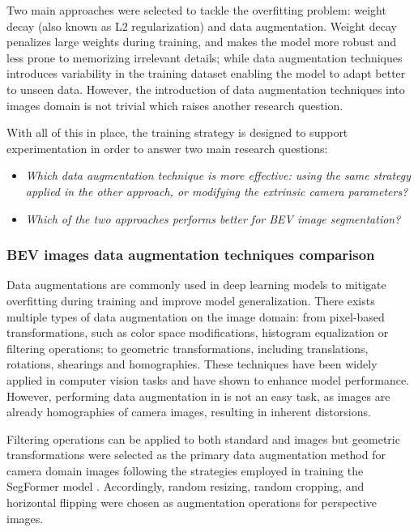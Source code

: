 Two main approaches were selected to tackle the overfitting problem: weight decay (also known as L2 regularization) and data augmentation. Weight decay penalizes large weights during training, and makes the model more robust and less prone to memorizing irrelevant details; while data augmentation techniques introduces variability in the training dataset enabling the model to adapt better to unseen data. However, the introduction of data augmentation techniques into  images domain is not trivial which raises another research question.

With all of this in place, the training strategy is designed to support experimentation in order to answer two main research questions:

\begin{itemize}
    \item \textit{Which data augmentation technique is more effective: using the same strategy applied in the other approach, or modifying the extrinsic camera parameters?}
    \item \textit{Which of the two approaches performs better for BEV image segmentation?}
\end{itemize}

\subsubsection{BEV images data augmentation techniques comparison}
Data augmentations are commonly used in deep learning models to mitigate overfitting during training and improve model generalization. There exists multiple types of data augmentation on the image domain: from pixel-based transformations, such as color space modifications, histogram equalization or filtering operations; to geometric transformations, including translations, rotations, shearings and homographies. These techniques have been widely applied in computer vision tasks and have shown to enhance model performance. However, performing data augmentation in  is not an easy task, as  images are already homographies of camera images, resulting in inherent distorsions.

Filtering operations can be applied to both standard and  images but geometric transformations were selected as the primary data augmentation method for camera domain images following the strategies employed in training the SegFormer model \cite{segformer}. Accordingly, random resizing, random cropping, and horizontal flipping were chosen as augmentation operations for perspective images.


